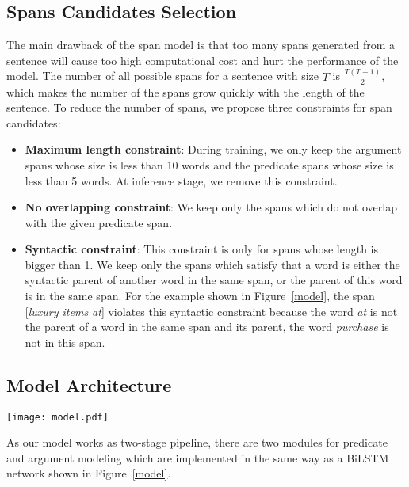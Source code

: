 \documentclass[letterpaper]{article} \usepackage{aaai20}  \usepackage{times}  \usepackage{helvet} \usepackage{courier}  \usepackage[hyphens]{url}  \urlstyle{rm} \def\UrlFont{\rm}  \usepackage{graphicx}  \frenchspacing  \setlength{\pdfpagewidth}{8.5in}  \setlength{\pdfpageheight}{11in}
\begin{document}
\subsection{Spans Candidates Selection}
The main drawback of the span model is that too many spans generated from a sentence will cause too high computational cost and hurt the performance of the model. The number of all possible spans for a sentence with size $T$ is $\frac{T(T+1)}{2}$, which makes the number of the spans grow quickly with the length of the sentence. To reduce the number of spans, we propose three constraints for span candidates:
\begin{itemize}
\item {\textbf{Maximum length constraint}}: During training, we only keep the argument spans whose size is less than 10 words and the predicate spans whose size is less than 5 words. At inference stage, we remove this constraint.
\item {\textbf{No overlapping constraint}}:  We keep only the spans which do not overlap with the given predicate span.
\item {\textbf{Syntactic constraint}}: This constraint is only for spans whose length is bigger than 1. We keep only the spans which satisfy that a word is either the syntactic parent of another word in the same span, or the parent of this word is in the same span. For the example shown in Figure~\ref{model}, the span [\emph{luxury items at}] violates this syntactic constraint because the word \emph{at} is not the parent of a word in the same span and its parent, the word \emph{purchase} is not in this span.
\end{itemize}

\subsection{Model Architecture}

\begin{figure*}[ht]
\begin{center}
\texttt{[image: model.pdf]}
\caption{An overview of the span model}
\label{model}
\end{center}
\end{figure*}

As our model works as two-stage pipeline, there are two modules for predicate and argument modeling which are implemented in the same way as a BiLSTM network shown in Figure~\ref{model}. 
\end{document}
